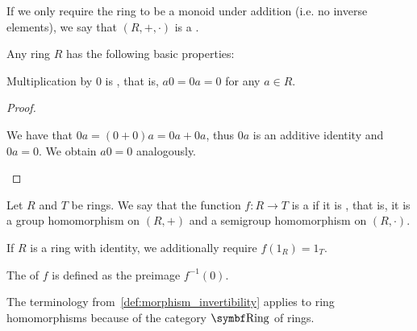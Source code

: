\begin{definition}
  If we only require the ring to be a monoid under addition (i.e. no inverse elements), we say that \( (R, +, \cdot) \) is a .
\end{definition}

\begin{proposition}\label{def:ring_properties}
  Any ring \( R \) has the following basic properties:
  \begin{defenum}
     Multiplication by \( 0 \) is , that is, \( a0 = 0a = 0 \) for any \( a \in R \).
  \end{defenum}
\end{proposition}
\begin{proof}\mbox{}
  \begin{itemize}
     We have that \( 0a = (0 + 0)a = 0a + 0a \), thus \( 0a \) is an additive identity and \( 0a = 0 \). We obtain \( a0 = 0 \) analogously.
  \end{itemize}
\end{proof}

\begin{definition}\label{def:ring_homomorphism}
  Let \( R \) and \( T \) be rings. We say that the function \( f: R \to T \) is a  if it is , that is, it is a group homomorphism on \( (R, +) \) and a semigroup homomorphism on \( (R, \cdot) \).

  If \( R \) is a ring with identity, we additionally require \( f(1_R) = 1_T \).

  The  of \( f \) is defined as the preimage \( f^{-1}(0) \).

  The terminology from~\cref{def:morphism_invertibility} applies to ring homomorphisms because of the category \( \Bold{Ring} \) of rings.
\end{definition}


